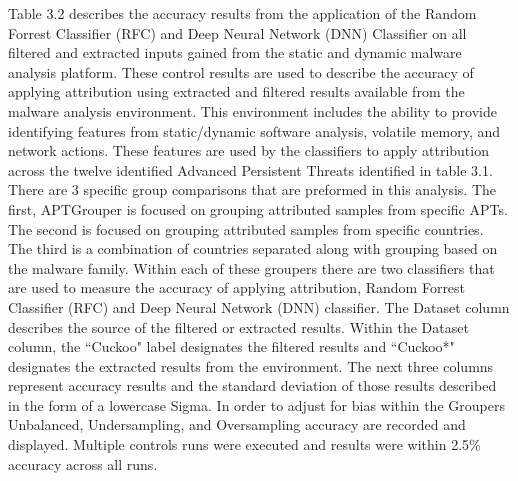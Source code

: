 \documentclass[12pt]{report}
\begin{document}
Table 3.2 describes the accuracy results from the application of the Random Forrest Classifier (RFC) and Deep Neural Network (DNN) Classifier on all filtered and extracted inputs gained from the static and dynamic malware analysis platform.  These control results are used to describe the accuracy of applying attribution using extracted and filtered results available from the malware analysis environment.  This environment includes the ability to provide identifying features from static/dynamic software analysis, volatile memory, and network actions.  These features are used by the classifiers to apply attribution across the twelve identified Advanced Persistent Threats identified in table 3.1.  There are 3 specific group comparisons that are preformed in this analysis.  The first, APTGrouper is focused on grouping attributed samples from specific APTs.  The second is focused on grouping attributed samples from specific countries.  The third is a combination of countries separated along with grouping based on the malware family.  Within each of these groupers there are two classifiers that are used to measure the accuracy of applying attribution, Random Forrest Classifier (RFC) and Deep Neural Network (DNN) classifier.  The Dataset column describes the source of the filtered or extracted results.  Within the Dataset column, the ``Cuckoo" label designates the filtered results and ``Cuckoo*" designates the extracted results from the environment.  The next three columns represent accuracy results and the standard deviation of those results described in the form of a lowercase Sigma.  In order to adjust for bias within the Groupers Unbalanced, Undersampling, and Oversampling accuracy are recorded and displayed.  Multiple controls runs were executed and results were within 2.5\% accuracy across all runs.
\end{document}
